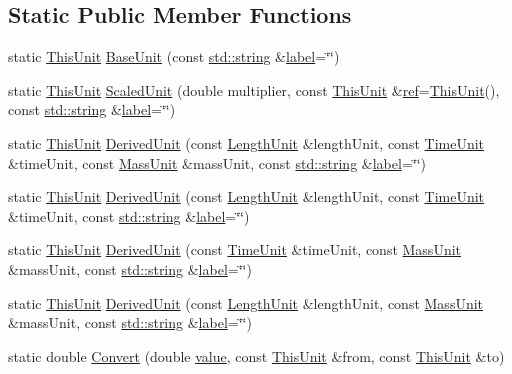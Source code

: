 \subsection*{Static Public Member Functions}
\begin{DoxyCompactItemize}
\item 
static \hyperlink{class_unit}{This\+Unit} \hyperlink{class_unit_aa2102921ecd21d9938707db58e4df964}{Base\+Unit} (const \hyperlink{glext_8h_ae84541b4f3d8e1ea24ec0f466a8c568b}{std\+::string} \&\hyperlink{glext_8h_a9371a1f53f8067997cd15aaf657c62d0}{label}=\char`\"{}\char`\"{})
\item 
static \hyperlink{class_unit}{This\+Unit} \hyperlink{class_unit_aa44ac3044c0cdb834cd220652e5d1c40}{Scaled\+Unit} (double multiplier, const \hyperlink{class_unit}{This\+Unit} \&\hyperlink{glext_8h_ad32bdec748ba376f6c0d2df39ab9a95b}{ref}=\hyperlink{class_unit}{This\+Unit}(), const \hyperlink{glext_8h_ae84541b4f3d8e1ea24ec0f466a8c568b}{std\+::string} \&\hyperlink{glext_8h_a9371a1f53f8067997cd15aaf657c62d0}{label}=\char`\"{}\char`\"{})
\item 
static \hyperlink{class_unit}{This\+Unit} \hyperlink{class_unit_a62b5aa1a4619ce98223eb728f91cf28d}{Derived\+Unit} (const \hyperlink{class_unit}{Length\+Unit} \&length\+Unit, const \hyperlink{class_unit}{Time\+Unit} \&time\+Unit, const \hyperlink{class_unit}{Mass\+Unit} \&mass\+Unit, const \hyperlink{glext_8h_ae84541b4f3d8e1ea24ec0f466a8c568b}{std\+::string} \&\hyperlink{glext_8h_a9371a1f53f8067997cd15aaf657c62d0}{label}=\char`\"{}\char`\"{})
\item 
static \hyperlink{class_unit}{This\+Unit} \hyperlink{class_unit_ab06f5f16f209acf9edf464eab887147d}{Derived\+Unit} (const \hyperlink{class_unit}{Length\+Unit} \&length\+Unit, const \hyperlink{class_unit}{Time\+Unit} \&time\+Unit, const \hyperlink{glext_8h_ae84541b4f3d8e1ea24ec0f466a8c568b}{std\+::string} \&\hyperlink{glext_8h_a9371a1f53f8067997cd15aaf657c62d0}{label}=\char`\"{}\char`\"{})
\item 
static \hyperlink{class_unit}{This\+Unit} \hyperlink{class_unit_a5d25b24d83374e3955347683fac527b9}{Derived\+Unit} (const \hyperlink{class_unit}{Time\+Unit} \&time\+Unit, const \hyperlink{class_unit}{Mass\+Unit} \&mass\+Unit, const \hyperlink{glext_8h_ae84541b4f3d8e1ea24ec0f466a8c568b}{std\+::string} \&\hyperlink{glext_8h_a9371a1f53f8067997cd15aaf657c62d0}{label}=\char`\"{}\char`\"{})
\item 
static \hyperlink{class_unit}{This\+Unit} \hyperlink{class_unit_a49e42c94a0eaca0f7aee6ccfc100796a}{Derived\+Unit} (const \hyperlink{class_unit}{Length\+Unit} \&length\+Unit, const \hyperlink{class_unit}{Mass\+Unit} \&mass\+Unit, const \hyperlink{glext_8h_ae84541b4f3d8e1ea24ec0f466a8c568b}{std\+::string} \&\hyperlink{glext_8h_a9371a1f53f8067997cd15aaf657c62d0}{label}=\char`\"{}\char`\"{})
\item 
static double \hyperlink{class_unit_acf57b62d40c90ed9fa71375374dc3eb6}{Convert} (double \hyperlink{glext_8h_a79169be77d7e02a24f68a5bfe627dc29}{value}, const \hyperlink{class_unit}{This\+Unit} \&from, const \hyperlink{class_unit}{This\+Unit} \&to)
\end{DoxyCompactItemize}


